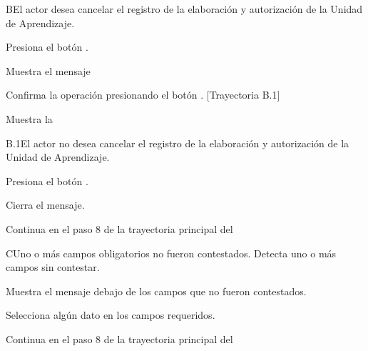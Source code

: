 
\begin{UCtrayectoriaA}{B}{El actor desea cancelar el registro de la elaboración y autorización de la Unidad de Aprendizaje.}

\UCpaso[\UCactor] Presiona el botón .

\UCpaso Muestra el mensaje 

\UCpaso[\UCactor] Confirma la operación presionando el botón . [Trayectoria B.1]

\UCpaso Muestra la 

\end{UCtrayectoriaA}


\begin{UCtrayectoriaA}{B.1}{El actor no desea cancelar el registro de la elaboración y autorización de la Unidad de Aprendizaje.}

\UCpaso[\UCactor] Presiona el botón .

\UCpaso Cierra el mensaje.

\UCpaso Continua en el paso 8 de la trayectoria principal del 

\end{UCtrayectoriaA}


\begin{UCtrayectoriaA}{C}{Uno o más campos obligatorios no fueron contestados.}
    \UCpaso Detecta uno o más campos sin contestar.
    
    \UCpaso Muestra el mensaje  debajo de los campos que no fueron contestados.

    \UCpaso[\UCactor] Selecciona algún dato en los campos requeridos.
    
    \UCpaso Continua en el paso 8 de la trayectoria principal del 
\end{UCtrayectoriaA}
